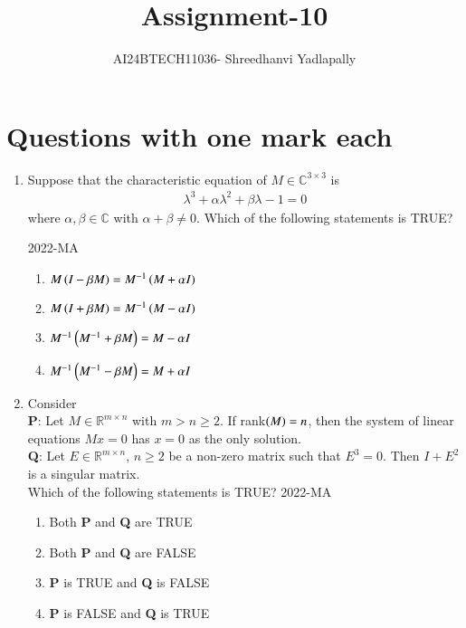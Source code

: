 \documentclass[journal,12pt,onecolumn]{IEEEtran}
\theoremstyle{remark}
\begin{document}

\vspace{3cm}

\title{Assignment-10}
\author{AI24BTECH11036- Shreedhanvi Yadlapally}
\maketitle

\bigskip
\renewcommand{\thefigure}{\theenumi}
\renewcommand{\thetable}{\theenumi}
\section{Questions with one mark each}

\begin{enumerate}

\item Suppose that the characteristic equation of $M \in \mathbb{C}^{3 \times 3}$ is 
	\begin{align*}
		\lambda^{3}+\alpha \lambda^{2} + \beta \lambda -1=0
	\end{align*}
where $\alpha, \beta \in \mathbb{C}$ with $\alpha+\beta \neq 0$. Which of the following statements is TRUE?
		
		\hfill{2022-MA}
	\begin{enumerate}
		\item $M\left(I-\beta M\right)=M^{-1} \left(M+ \alpha I\right)$
		\item $M\left(I+\beta M\right)=M^{-1} \left(M- \alpha I\right)$
		\item $M^{-1}\left(M^{-1}+\beta M\right)=M-\alpha I$
		\item $M^{-1}\left(M^{-1}-\beta M\right)=M+\alpha I$
	\end{enumerate}

\item Consider \\
\textbf{P}: Let $M \in \mathbb{R}^{m \times n}$ with $m>n\geq 2$. If rank$\left(M\right)=n$, then the system of linear equations $Mx=0$ has $x=0$ as the only solution. \\
\textbf{Q}: Let $E \in \mathbb{R}^{m \times n}$, $n\geq 2$ be a non-zero matrix such that $E^{3}=0$. Then $I+E^2$ is a singular matrix. \\
Which of the following statements is TRUE?
\hfill{2022-MA}

	\begin{enumerate}
		\item Both \textbf{P} and \textbf{Q} are TRUE
		\item Both \textbf{P} and \textbf{Q} are FALSE
		\item \textbf{P} is TRUE and \textbf{Q} is FALSE
		\item \textbf{P} is FALSE and \textbf{Q} is TRUE
	\end{enumerate}


\end{enumerate}
\end{document}
